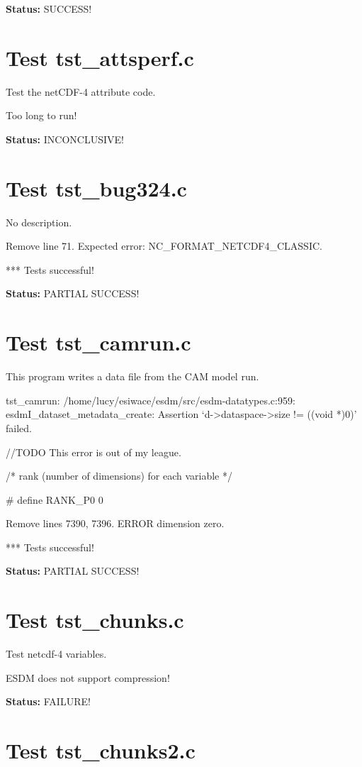 {\bf \large Status: } SUCCESS!

\section{Test tst\_attsperf.c}

Test the netCDF-4 attribute code.

Too long to run!

{\bf \large Status: } INCONCLUSIVE!

\section{Test tst\_bug324.c}

No description.

Remove line 71. Expected error: NC\_FORMAT\_NETCDF4\_CLASSIC.

*** Tests successful!

{\bf \large Status: } PARTIAL SUCCESS!

\section{Test tst\_camrun.c}

This program writes a data file from the CAM model run.

tst\_camrun: /home/lucy/esiwace/esdm/src/esdm-datatypes.c:959: esdmI\_dataset\_metadata\_create: Assertion `d->dataspace->size != ((void *)0)' failed.

//TODO This error is out of my league.

/* rank (number of dimensions) for each variable */

\#   define RANK\_P0 0

Remove lines 7390, 7396. ERROR dimension zero.

*** Tests successful!

{\bf \large Status: } PARTIAL SUCCESS!

\section{Test tst\_chunks.c}

Test netcdf-4 variables.

ESDM does not support compression!

{\bf \large Status: } FAILURE!

\section{Test tst\_chunks2.c}

